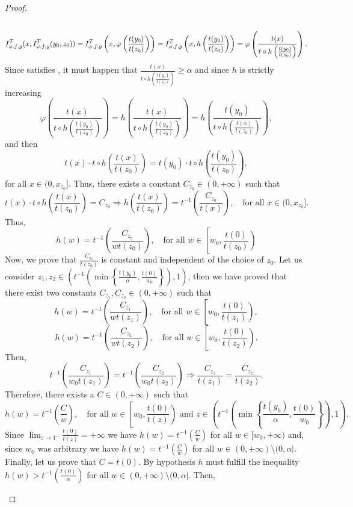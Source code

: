 \begin{proof}
\begin{itemize}
\begin{eqnarray*}
		\end{eqnarray*}
		$$I^T_{\varphi,f,g}(x,I^T_{\varphi,f,g}(y_0,z_0)) = I^T_{\varphi,f,g} \left(x,\varphi \left(\frac{t(y_0)}{t(z_0)}\right)\right) = I^T_{\varphi,f,g} \left(x, h \left(\frac{t(y_0)}{t(z_0)}\right)\right) = \varphi \left(\frac{t(x)}{t \circ h \left(\frac{t(y_0)}{t(z_0)}\right)}\right).$$
		Since \IT satisfies \EP, it must happen that $\frac{t(x)}{t \circ h \left(\frac{t(y_0)}{t(z_0)}\right)} \geq \alpha$ and since $h$ is strictly increasing 
		$$\varphi \left(\frac{t(x)}{t \circ h \left(\frac{t(y_0)}{t(z_0)}\right)}\right) = h \left(\frac{t(x)}{t \circ h \left(\frac{t(y_0)}{t(z_0)}\right)}\right) = h \left(\frac{t(y_0)}{t \circ h \left(\frac{t(x)}{t(z_0)}\right)}\right),$$ 
		and then
		$$t(x) \cdot t \circ h \left(\frac{t(x)}{t(z_0)}\right) = t(y_0) \cdot t \circ h \left(\frac{t(y_0)}{t(z_0)}\right),$$
		for all $x \in (0,x_{z_0}]$. Thus, there exists a constant $C_{z_0} \in (0,+\infty)$ such that
		$$ t(x) \cdot t \circ h \left(\frac{t(x)}{t(z_0)}\right) = C_{z_0} \Rightarrow h \left(\frac{t(x)}{t(z_0)}\right) = t^{-1} \left(\frac{C_{z_0}}{t(x)}\right), \quad \text{for all } x \in (0,x_{z_0}].$$
		Thus,
		$$
		h(w)=t^{-1}\left(\frac{C_{z_0}}{wt(z_0)}\right), \quad \text{for all } w \in \left [w_0, \frac{t(0)}{t(z_0)} \right)
		$$
		Now, we prove that $\frac{C_{z_0}}{t(z_0)}$ is constant and independent of the choice of $z_0$. Let us consider $z_1,z_2 \in \left(t^{-1}\left(\min \left \{\frac{t(y_0)}{\alpha},\frac{t(0)}{w_0}\right \} \right),1\right)$, then we have proved that there exist two constants $C_{z_1},C_{z_2} \in (0,+\infty)$ such that
		$$h(w)=t^{-1} \left( \frac{C_{z_1}}{wt(z_1)}\right), \quad \text{for all } w \in \left [ w_0, \frac{t(0)}{t(z_1)}\right),$$
		$$h(w)=t^{-1} \left( \frac{C_{z_2}}{wt(z_2)}\right), \quad \text{for all } w \in \left [w_0, \frac{t(0)}{t(z_2)}\right).$$
		Then,
		$$t^{-1}\left(\frac{C_{z_1}}{w_0t(z_1)}\right) = t^{-1}\left(\frac{C_{z_2}}{w_0t(z_2)}\right) \Rightarrow \frac{C_{z_1}}{t(z_1)} = \frac{C_{z_2}}{t(z_2)}.$$
		Therefore, there exists a $C \in (0,+\infty)$ such that
		$$h(w)=t^{-1}\left(\frac{C}{w}\right), \quad \text{for all } w \in \left[w_0,\frac{t(0)}{t(z)} \right) \text{ and } z \in \left(t^{-1}\left(\min \left \{\frac{t(y_0)}{\alpha},\frac{t(0)}{w_0}\right \} \right),1\right).$$
		Since $\lim_{z \to 1^-} \frac{t(0)}{t(z)} = + \infty$ we have $h(w)=t^{-1}\left(\frac{C}{w}\right)$ for all $w \in [w_0,+\infty)$ and, since $w_0$ was arbitrary we have $h(w)=t^{-1} \left(\frac{C}{w}\right)$ for all $w \in (0,+\infty)\setminus (0,\alpha|$. Finally, let us prove that $C=t(0)$. By hypothesis $h$ must fulfill the inequality $h(w) >t^{-1} \left(\frac{t(0)}{\alpha}\right)$ for all $w \in (0,+\infty) \setminus (0,\alpha|$. Then,

\end{itemize}
\end{proof}

